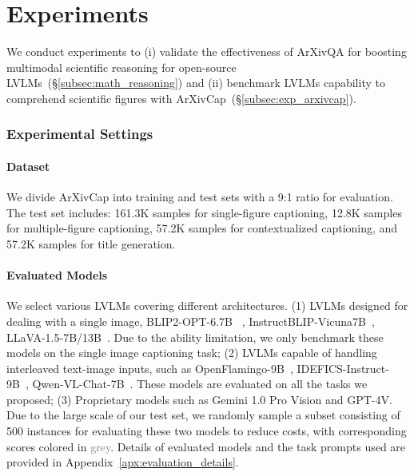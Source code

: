 

\section{Experiments}

We conduct experiments to (i) validate the effectiveness of ArXivQA for boosting multimodal scientific reasoning for open-source LVLMs~(\S\ref{subsec:math_reasoning}) and (ii) benchmark LVLMs capability to comprehend scientific figures with ArXivCap~(\S\ref{subsec:exp_arxivcap}).





\subsubsection{Experimental Settings}
\label{subsubsec:arxiv_cap_setting}




\paragraph{Dataset}
We divide ArXivCap into training and test sets with a 9:1 ratio for evaluation. The test set includes:
161.3K samples for single-figure captioning,
12.8K samples for multiple-figure captioning,
57.2K samples for contextualized captioning, and
57.2K samples for title generation.

\paragraph{Evaluated Models}
We select various LVLMs covering different architectures. 
(1) LVLMs designed for dealing with a single image, BLIP2-OPT-6.7B~\citep{li2023blip2}
, InstructBLIP-Vicuna7B~\citep{dai2023instructblip}, 
LLaVA-1.5-7B/13B~\citep{liu2023llava15}. Due to the ability limitation, we only benchmark these models on the single image captioning task;
(2) LVLMs capable of handling interleaved text-image inputs, such as OpenFlamingo-9B~\citep{Alayrac2022FlamingoAV,awadalla2023openflamingo}, IDEFICS-Instruct-9B~\citep{laurencon2023obelics}, Qwen-VL-Chat-7B~\citep{Qwen-VL}. These models are evaluated on all the tasks we proposed;
(3) Proprietary models such as Gemini 1.0 Pro Vision and GPT-4V.
Due to the large scale of our test set, we randomly sample a subset consisting of 500 instances for evaluating these two models to reduce costs, with corresponding scores colored in \textcolor{gray}{grey}. Details of evaluated models and the task prompts used are provided in Appendix~\ref{apx:evaluation_details}.

